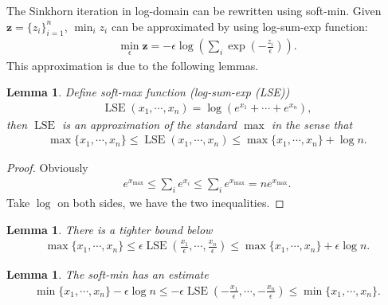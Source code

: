 \documentclass[11pt]{book}
\newtheorem{lemma}[theorem]{Lemma}
\begin{document}
The Sinkhorn iteration in log-domain can be rewritten using soft-min. Given $\mathbf{z} = \{z_i\}_{i=1}^n$, $\min_i z_i$ can be approximated by using log-sum-exp function:
\begin{align*}
    \min_{\epsilon} \mathbf{z} = -\epsilon \log \left( \sum_i \exp\left(-\frac{z_i}{\epsilon}\right) \right).
\end{align*}
This approximation is due to the following lemmas.
\begin{lemma}
    Define soft-max function (log-sum-exp (LSE))
    \begin{align*}
        \operatorname{LSE}(x_1,\cdots,x_n) = \log(e^{x_1}+\cdots+e^{x_n}),
    \end{align*}
    then $\operatorname{LSE}$ is an approximation of the standard $\max$ in the sense that
    \begin{align*}
        \max\{x_1,\cdots,x_n\} \le \operatorname{LSE}(x_1,\cdots,x_n) \le \max\{x_1,\cdots,x_n\}+\log n.
    \end{align*}
\end{lemma}
\begin{proof}
    Obviously
    \begin{align*}
        e^{x_{\max}}\le \sum_i e^{x_i} \le \sum_i e^{x_{\max}}=n e^{x_{\max}}.
    \end{align*}
    Take $\log$ on both sides, we have the two inequalities.
\end{proof}
\begin{lemma}
    There is a tighter bound below
    \begin{align*}
        \max\{x_1,\cdots,x_n\} \le \epsilon \operatorname{LSE}\left(\frac{x_1}{\epsilon},\cdots,\frac{x_n}{\epsilon}\right) \le \max\{x_1,\cdots,x_n\}+\epsilon\log n.
    \end{align*}
\end{lemma}
\begin{lemma}
    The soft-min has an estimate
    \begin{align*}
        \min\{x_1,\cdots,x_n\} - \epsilon\log n \le - \epsilon \operatorname{LSE}\left(-\frac{x_1}{\epsilon},\cdots,-\frac{x_n}{\epsilon}\right) \le \min\{x_1,\cdots,x_n\}.
    \end{align*}
\end{lemma}
\end{document}
